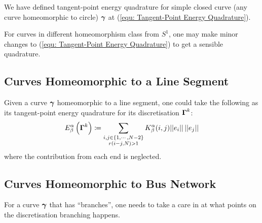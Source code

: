 \documentclass[../dissertation.tex]{subfiles}
\begin{document}
We have defined tangent-point energy quadrature for simple closed curve (any curve homeomorphic to circle) $\boldsymbol{\gamma}$ at (\ref{equ: Tangent-Point Energy Quadrature}).

For curves in different homeomorphism class from $S^1$,
one may make minor changes to (\ref{equ: Tangent-Point Energy Quadrature}) to get a sensible quadrature.

\subsection{Curves Homeomorphic to a Line Segment}
Given a curve $\boldsymbol{\gamma}$ homeomorphic to a line segment,
one could take the following as its tangent-point energy quadrature for its discretisation $\boldsymbol{\Gamma}^k$:
\begin{equation}
    E_{\beta}^{\alpha} \left( \boldsymbol{\Gamma}^k \right) \coloneqq \sum_{\substack{i,j \in \left\{ 1, \cdots, N-2 \right\} \\ r\left( i-j,N \right) > 1}} K_{\beta}^{\alpha} (i,j) \lvert \lvert e_i \rvert \rvert \, \lvert \lvert e_j \rvert \rvert
\end{equation}
where the contribution from each end is neglected.

\subsection{Curves Homeomorphic to Bus Network}
For a curve $\boldsymbol{\gamma}$ that has ``branches'', one needs to take a care in at what points on the discretisation branching happens.
\end{document}
